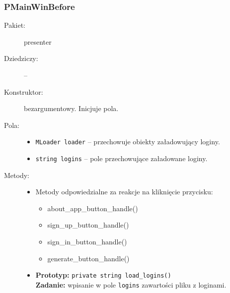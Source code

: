 \documentclass[a4paper]{article}
\newcommand{\prog}{\texttt}
\begin{document}
\subsubsection{PMainWinBefore}
\begin{description}
    \item[Pakiet:] presenter
    \item[Dziedziczy:] --
    \item[Konstruktor:] bezargumentowy. Inicjuje pola.
    \item[Pola:] \hfill
    \begin{itemize}
        \item \prog{MLoader loader} -- przechowuje obiekty załadowujący loginy.
        \item \prog{string logins} -- pole przechowujące załadowane loginy.
    \end{itemize}
    \item[Metody:] \hfill
    \begin{itemize}
        \item Metody odpowiedzialne za reakcje na kliknięcie przycisku:
        \begin{itemize}
            \item about\_app\_button\_handle()
            \item sign\_up\_button\_handle()
            \item sign\_in\_button\_handle()
            \item generate\_button\_handle()
        \end{itemize}
        \item \textbf{Prototyp:} \prog{private string load\_logins()}\\\textbf{Zadanie:} wpisanie w pole \prog{logins} zawartości pliku z loginami.
    \end{itemize}
\end{description}
\end{document}

